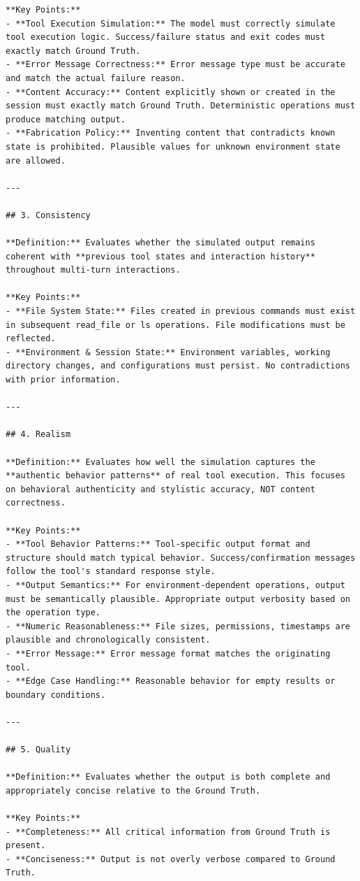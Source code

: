 \documentclass{llmxive}
\begin{document}
\begin{lstlisting}
**Key Points:**
- **Tool Execution Simulation:** The model must correctly simulate tool execution logic. Success/failure status and exit codes must exactly match Ground Truth.
- **Error Message Correctness:** Error message type must be accurate and match the actual failure reason.
- **Content Accuracy:** Content explicitly shown or created in the session must exactly match Ground Truth. Deterministic operations must produce matching output.
- **Fabrication Policy:** Inventing content that contradicts known state is prohibited. Plausible values for unknown environment state are allowed.

---

## 3. Consistency

**Definition:** Evaluates whether the simulated output remains coherent with **previous tool states and interaction history** throughout multi-turn interactions.

**Key Points:**
- **File System State:** Files created in previous commands must exist in subsequent read_file or ls operations. File modifications must be reflected.
- **Environment & Session State:** Environment variables, working directory changes, and configurations must persist. No contradictions with prior information.

---

## 4. Realism

**Definition:** Evaluates how well the simulation captures the **authentic behavior patterns** of real tool execution. This focuses on behavioral authenticity and stylistic accuracy, NOT content correctness.

**Key Points:**
- **Tool Behavior Patterns:** Tool-specific output format and structure should match typical behavior. Success/confirmation messages follow the tool's standard response style.
- **Output Semantics:** For environment-dependent operations, output must be semantically plausible. Appropriate output verbosity based on the operation type.
- **Numeric Reasonableness:** File sizes, permissions, timestamps are plausible and chronologically consistent.
- **Error Message:** Error message format matches the originating tool.
- **Edge Case Handling:** Reasonable behavior for empty results or boundary conditions.

---

## 5. Quality

**Definition:** Evaluates whether the output is both complete and appropriately concise relative to the Ground Truth.

**Key Points:**
- **Completeness:** All critical information from Ground Truth is present.
- **Conciseness:** Output is not overly verbose compared to Ground Truth.
\end{lstlisting}
\end{document}
